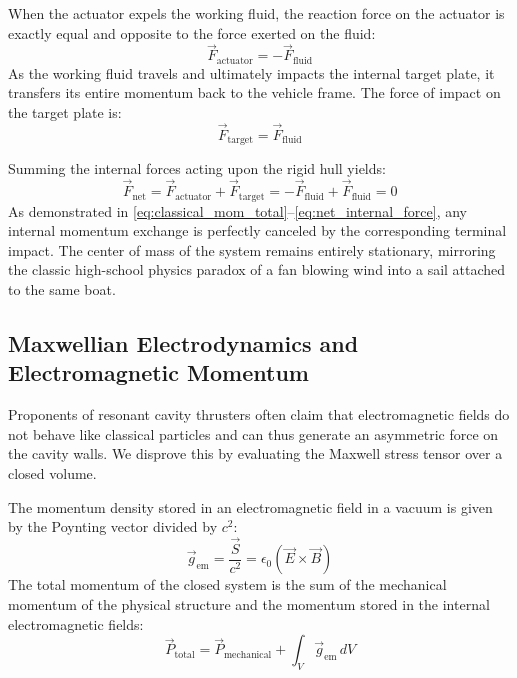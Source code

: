 \documentclass[journal,10pt,twoside]{IEEEtran}
\begin{document}
When the actuator expels the working fluid, the reaction force on the actuator is exactly equal and opposite to the force exerted on the fluid:
\begin{equation}
\vec{F}_{\text{actuator}} = -\vec{F}_{\text{fluid}}
\label{eq:reaction_force}
\end{equation}
As the working fluid travels and ultimately impacts the internal target plate, it transfers its entire momentum back to the vehicle frame. The force of impact on the target plate is:
\begin{equation}
\vec{F}_{\text{target}} = \vec{F}_{\text{fluid}}
\label{eq:target_force}
\end{equation}

Summing the internal forces acting upon the rigid hull yields:
\begin{equation}
\vec{F}_{\text{net}} = \vec{F}_{\text{actuator}} + \vec{F}_{\text{target}} = -\vec{F}_{\text{fluid}} + \vec{F}_{\text{fluid}} = 0
\label{eq:net_internal_force}
\end{equation}
As demonstrated in \eqref{eq:classical_mom_total}--\eqref{eq:net_internal_force}, any internal momentum exchange is perfectly canceled by the corresponding terminal impact. The center of mass of the system remains entirely stationary, mirroring the classic high-school physics paradox of a fan blowing wind into a sail attached to the same boat.

\subsection{Maxwellian Electrodynamics and Electromagnetic Momentum}
Proponents of resonant cavity thrusters often claim that electromagnetic fields do not behave like classical particles and can thus generate an asymmetric force on the cavity walls. We disprove this by evaluating the Maxwell stress tensor over a closed volume.

The momentum density stored in an electromagnetic field in a vacuum is given by the Poynting vector divided by $c^2$:
\begin{equation}
\vec{g}_{\text{em}} = \frac{\vec{S}}{c^2} = \epsilon_0 (\vec{E} \times \vec{B})
\label{eq:em_momentum_density}
\end{equation}
The total momentum of the closed system is the sum of the mechanical momentum of the physical structure and the momentum stored in the internal electromagnetic fields:
\begin{equation}
\vec{P}_{\text{total}} = \vec{P}_{\text{mechanical}} + \int_{V} \vec{g}_{\text{em}} \, dV
\label{eq:total_system_momentum}
\end{equation}
\end{document}
